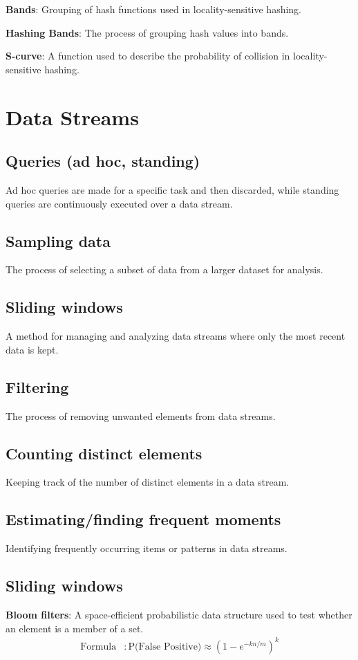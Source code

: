 \documentclass{article}
\begin{document}
\textbf{Bands}: Grouping of hash functions used in locality-sensitive hashing.

\textbf{Hashing Bands}: The process of grouping hash values into bands.

\textbf{S-curve}: A function used to describe the probability of collision in locality-sensitive hashing.

\section{Data Streams}

\subsection{Queries (ad hoc, standing)}
Ad hoc queries are made for a specific task and then discarded, while standing queries are continuously executed over a data stream.

\subsection{Sampling data}
The process of selecting a subset of data from a larger dataset for analysis.

\subsection{Sliding windows}
A method for managing and analyzing data streams where only the most recent data is kept.

\subsection{Filtering}
The process of removing unwanted elements from data streams.

\subsection{Counting distinct elements}
Keeping track of the number of distinct elements in a data stream.

\subsection{Estimating/finding frequent moments}
Identifying frequently occurring items or patterns in data streams.

\subsection{Sliding windows}
\textbf{Bloom filters}: A space-efficient probabilistic data structure used to test whether an element is a member of a set.
\begin{align*}
    \text{Formula} &: \text{P(False Positive)} \approx (1 - e^{-kn/m})^k
\end{align*}
\end{document}
